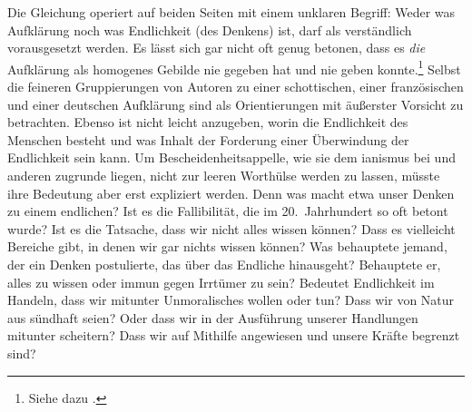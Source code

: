 Die Gleichung  operiert
auf beiden Seiten mit einem unklaren Begriff: Weder was Aufklärung noch was
Endlichkeit (des Denkens) ist, darf als verständlich vorausgesetzt werden. Es
lässt sich gar nicht oft genug betonen, dass es \emph{die} Aufklärung als
homogenes Gebilde nie gegeben hat und nie geben
konnte.\footnote{Siehe dazu
\cite{Fulda:GabesenquotedieAufklaerung2013}.} Selbst die feineren Gruppierungen von Autoren zu einer
schottischen, einer französischen und einer deutschen Aufklärung sind als Orientierungen mit äußerster Vorsicht zu betrachten. Ebenso ist nicht leicht anzugeben, worin die Endlichkeit des Menschen besteht und was Inhalt der Forderung einer Überwindung der
Endlichkeit sein kann. Um Bescheidenheitsappelle, wie sie dem
ianismus bei  und anderen
zugrunde liegen, nicht zur leeren Worthülse werden zu lassen, müsste ihre
Bedeutung aber erst expliziert werden. Denn was macht etwa unser Denken zu einem
endlichen? Ist es die Fallibilität, die im 20.\ Jahrhundert so oft betont wurde?
Ist es die Tatsache, dass wir nicht alles wissen können? Dass es vielleicht
Bereiche gibt, in denen wir gar nichts wissen können? Was behauptete jemand, der
ein Denken postulierte, das über das Endliche hinausgeht? Behauptete er, alles
zu wissen oder immun gegen Irrtümer zu sein? Bedeutet Endlichkeit im Handeln,
dass wir mitunter Unmoralisches wollen oder tun? Dass wir von Natur aus sündhaft
seien? Oder dass wir in der Ausführung unserer Handlungen mitunter scheitern?
Dass wir auf Mithilfe angewiesen und unsere Kräfte begrenzt sind?


